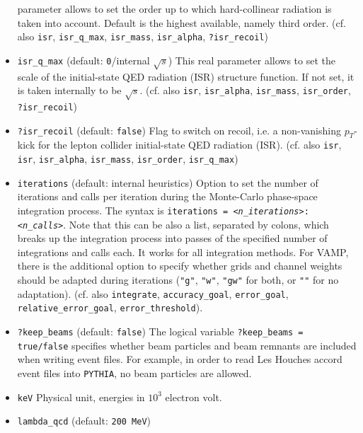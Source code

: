 \documentclass[12pt]{book}
\newcommand{\ttt}[1]{\texttt{#1}}
\newcommand{\pythia}{\texttt{PYTHIA}}
\begin{document}
\begin{itemize}
parameter allows to set the order up to which hard-collinear radiation
is taken into account. Default is the highest available, namely third
order. (cf. also \ttt{isr}, \ttt{isr\_q\_max}, \ttt{isr\_mass},
\ttt{isr\_alpha}, \ttt{?isr\_recoil})
\item
\ttt{isr\_q\_max} \qquad (default: \ttt{0}/internal $\sqrt{s}$)
\newline
This real parameter allows to set the scale of the initial-state
QED radiation (ISR) structure function. If not set, it is taken internally
to be $\sqrt{s}$.
(cf. also \ttt{isr}, \ttt{isr\_alpha}, \ttt{isr\_mass},
\ttt{isr\_order}, \ttt{?isr\_recoil})
\item
\ttt{?isr\_recoil} \qquad (default: \ttt{false}) \newline
Flag to switch on recoil, i.e. a non-vanishing $p_T$-kick for the
lepton collider initial-state QED radiation (ISR). 
(cf. also \ttt{isr}, \ttt{isr}, \ttt{isr\_alpha}, \ttt{isr\_mass},
\ttt{isr\_order}, \ttt{isr\_q\_max})
\item
\ttt{iterations} \qquad (default: internal heuristics) \newline
Option to set the number of iterations and calls per iteration during
the Monte-Carlo phase-space integration process. The syntax is 
\ttt{iterations = {\em <n\_iterations>}:{\em <n\_calls>}}. Note that this can be
also a list, separated by colons, which breaks up the integration
process into passes of the specified number of integrations and calls
each. It works for all integration methods. For VAMP, there is the
additional option to specify whether grids and channel weights should
be adapted during iterations (\ttt{"g"}, \ttt{"w"},
\ttt{"gw"} for both, or \ttt{""} for no adaptation).   (cf. also
\ttt{integrate}, \ttt{accuracy\_goal}, \ttt{error\_goal},
\ttt{relative\_error\_goal}, \ttt{error\_threshold}).   
\item
\ttt{?keep\_beams} \qquad (default: \ttt{false}) \newline
The logical variable \texttt{?keep\_beams = true/false} specifies whether
beam particles and beam remnants are included when writing event files.
For example, in order to read Les Houches accord event files into \pythia,
no beam particles are allowed.
\item
\ttt{keV} \newline
Physical unit, energies in $10^3$ electron volt. 
\item
\ttt{lambda\_qcd} \qquad (default: \ttt{200 MeV}) \newline

\end{itemize}
\end{document}
